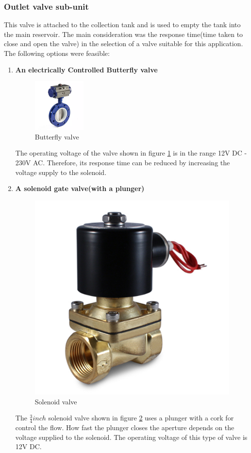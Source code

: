 \subsubsection{Outlet valve sub-unit}
This valve is attached to the collection tank and is used to empty the tank into the main reservoir. The main consideration was the response time(time taken to close and open the valve) in the selection of a valve suitable for this application. The following options were feasible:
\begin{enumerate}
    \item \textbf{An electrically Controlled Butterfly valve}
    \par
    \begin{figure}[H]
        \centering
        \includegraphics[width=0.25\textwidth, height=.25\textheight]{Figures/butterflyValve.png}
        \caption[Butterfly valve]{Butterfly valve \cite{butterfly}}
        \label{fig:butterfly_valve}
    \end{figure}
    The operating voltage of the valve shown in figure \ref{fig:butterfly_valve} is in the range 12V DC - 230V AC. Therefore, its response time can be reduced by increasing the voltage supply to the solenoid.
    \item \textbf{A solenoid gate valve(with a plunger)}
    \par
    \begin{figure}[H]
        \centering
        \includegraphics[width=.25\textwidth, height=.25\textheight]{Figures/solenoidValve.jpg}
        \caption[Solenoid valve]{Solenoid valve \cite{solenoid}}
        \label{fig:solenoid_valve}
    \end{figure}
    The $\frac{3}{4} inch$ solenoid valve shown in figure \ref{fig:solenoid_valve} uses a plunger with a cork for control the flow. How fast the plunger closes the aperture depends on the voltage supplied to the solenoid. The operating voltage of this type of valve is 12V DC.
\end{enumerate}

